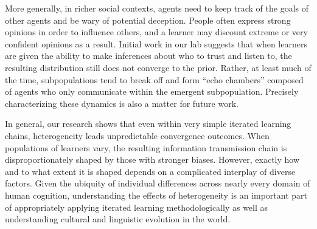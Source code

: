 \documentclass[doc]{apa6}
\begin{document}
More generally, in richer social contexts, agents need to keep track of the goals of other agents and be wary of potential deception. People often express strong opinions in order to influence others, and a learner may discount extreme or very confident opinions as a result. Initial work in our lab suggests that when learners are given the ability to make inferences about who to trust and listen to, the resulting distribution still does not converge to the prior. Rather, at least much of the time, subpopulations tend to break off and form ``echo chambers'' composed of agents who only communicate within the emergent subpopulation. Precisely characterizing these dynamics is also a matter for future work.

In general, our research shows that even within very simple iterated learning chains, heterogeneity leads unpredictable convergence outcomes. When populations of learners vary, the resulting information transmission chain is disproportionately shaped by those with stronger biases. However, exactly how and to what extent it is shaped depends on a complicated interplay of diverse factors. Given the ubiquity of individual differences across nearly every domain of human cognition, understanding the effects of heterogeneity is an important part of appropriately applying iterated learning methodologically as well as understanding cultural and linguistic evolution in the world. 


\printbibliography
\end{document}
